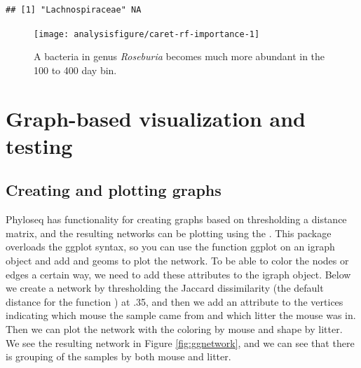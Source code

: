 \begin{knitrout}
\color{fgcolor}\begin{kframe}
\begin{alltt}
\hlstd{(}\hlstd{(ps)[}\hlstd{(}\hlopt{$} \hlstd{(}\hlstd{,} \hlstd{)])}
\end{alltt}
\begin{verbatim}
## [1] "Lachnospiraceae" NA
\end{verbatim}
\begin{alltt}
 \hlkwb{<-} \hlstd{(}\hlstd{(pslog)[,}\hlstd{(}\hlopt{$}\hlstd{finalModel))])}
 \hlkwb{<-} \hlstd{(}  
 \hlopt{+}   \hlstd{(}\hlstd{(}  \hlopt{+}
   \hlopt{~}  \hlopt{+}
  \hlstd{(} \hlstd{=} \hlstd{,}  \hlstd{=} \hlstd{)}
\end{alltt}
\end{kframe}
\end{knitrout}
\begin{figure}[H]
\texttt{[image: analysisfigure/caret-rf-importance-1]}
\caption{A bacteria in genus \emph{Roseburia} becomes much more abundant in
  the 100 to 400 day bin.}
\label{fig:caret-rf-importance}
\end{figure}

\section*{Graph-based visualization and testing}

\subsection*{Creating and plotting graphs}

Phyloseq has functionality for creating graphs based on thresholding a
distance matrix, and the resulting networks can be plotting using the
. This package overloads the ggplot syntax, so you
can use the function ggplot on an igraph object and add
 and  geoms to plot the
network. To be able to color the nodes or edges a certain way, we need
to add these attributes to the igraph object. Below we create a
network by thresholding the Jaccard dissimilarity (the default
distance for the function ) at .35, and then we
add an attribute to the vertices indicating which mouse the sample
came from and which litter the mouse was in. Then we can plot the
network with the coloring by mouse and shape by litter. We see the
resulting network in Figure \ref{fig:ggnetwork}, and we can see that there is
grouping of the samples by both mouse and litter.

